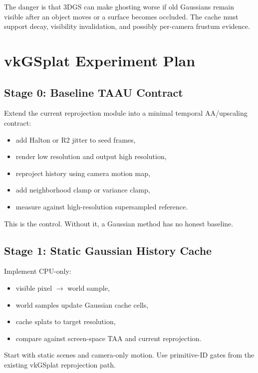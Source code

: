 \documentclass[11pt]{article}
\begin{document}
The danger is that 3DGS can make ghosting worse if old Gaussians remain visible
after an object moves or a surface becomes occluded. The cache must support
decay, visibility invalidation, and possibly per-camera frustum evidence.

\section{vkGSplat Experiment Plan}

\subsection{Stage 0: Baseline TAAU Contract}

Extend the current reprojection module into a minimal temporal AA/upscaling
contract:

\begin{itemize}
  \item add Halton or R2 jitter to seed frames,
  \item render low resolution and output high resolution,
  \item reproject history using camera motion map,
  \item add neighborhood clamp or variance clamp,
  \item measure against high-resolution supersampled reference.
\end{itemize}

This is the control. Without it, a Gaussian method has no honest baseline.

\subsection{Stage 1: Static Gaussian History Cache}

Implement CPU-only:

\begin{itemize}
  \item visible pixel $\rightarrow$ world sample,
  \item world samples update Gaussian cache cells,
  \item cache splats to target resolution,
  \item compare against screen-space TAA and current reprojection.
\end{itemize}

Start with static scenes and camera-only motion. Use primitive-ID gates from
the existing vkGSplat reprojection path.
\end{document}
